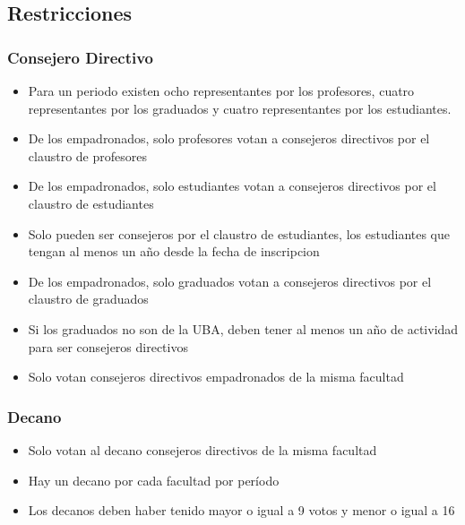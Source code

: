 \documentclass[a4paper, 10pt, twoside]{article}
\begin{document}
\subsection{Restricciones}


\subsubsection{Consejero Directivo}

\begin{itemize}
\item Para un periodo existen ocho representantes por los profesores, cuatro representantes por los graduados y cuatro representantes por los estudiantes.
\item De los empadronados, solo profesores votan a consejeros directivos por el claustro de profesores
\item De los empadronados, solo estudiantes votan a consejeros directivos por el claustro de estudiantes
\item Solo pueden ser consejeros por el claustro de estudiantes, los estudiantes que tengan al menos un año desde la fecha de inscripcion
\item De los empadronados, solo graduados votan a consejeros directivos por el claustro de graduados
\item Si los graduados no son de la UBA, deben tener al menos un año de actividad para ser consejeros directivos
\item Solo votan consejeros directivos empadronados de la misma facultad
\end{itemize}


\subsubsection{Decano}

\begin{itemize}
\item Solo votan al decano consejeros directivos de la misma facultad
\item Hay un decano por cada facultad por período
\item Los decanos deben haber tenido mayor o igual a 9 votos y menor o igual a 16
\end{itemize}
\end{document}
